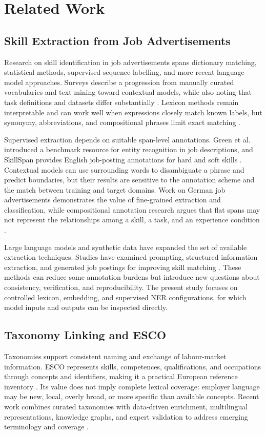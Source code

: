 \documentclass[conference]{IEEEtran}
\begin{document}
\section{Related Work}
\subsection{Skill Extraction from Job Advertisements}
Research on skill identification in job advertisements spans dictionary matching, statistical methods, supervised sequence labelling, and more recent language-model approaches. Surveys describe a progression from manually curated vocabularies and text mining toward contextual models, while also noting that task definitions and datasets differ substantially \cite{Khaouja2021,Rahhal2024,Senger2024}. Lexicon methods remain interpretable and can work well when expressions closely match known labels, but synonymy, abbreviations, and compositional phrases limit exact matching \cite{Napierala2024,Ao2023}.

Supervised extraction depends on suitable span-level annotations. Green et al. introduced a benchmark resource for entity recognition in job descriptions, and SkillSpan provides English job-posting annotations for hard and soft skills \cite{Green2022,SkillSpan2022}. Contextual models can use surrounding words to disambiguate a phrase and predict boundaries, but their results are sensitive to the annotation scheme and the match between training and target domains. Work on German job advertisements demonstrates the value of fine-grained extraction and classification, while compositional annotation research argues that flat spans may not represent the relationships among a skill, a task, and an experience condition \cite{Gnehm2022,Kruger2025}.

Large language models and synthetic data have expanded the set of available extraction techniques. Studies have examined prompting, structured information extraction, and generated job postings for improving skill matching \cite{Nguyen2024,Howison2025,JobSkape2024}. These methods can reduce some annotation burdens but introduce new questions about consistency, verification, and reproducibility. The present study focuses on controlled lexicon, embedding, and supervised NER configurations, for which model inputs and outputs can be inspected directly.

\subsection{Taxonomy Linking and ESCO}
Taxonomies support consistent naming and exchange of labour-market information. ESCO represents skills, competences, qualifications, and occupations through concepts and identifiers, making it a practical European reference inventory \cite{ESCOPortal,ESCOClassification}. Its value does not imply complete lexical coverage: employer language may be new, local, overly broad, or more specific than available concepts. Recent work combines curated taxonomies with data-driven enrichment, multilingual representations, knowledge graphs, and expert validation to address emerging terminology and coverage \cite{Sleeman2018,ESCOXLMR2023,Kavas2025,DeSanto2026}.
\end{document}
